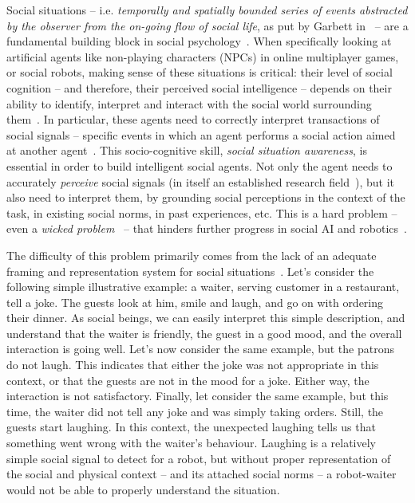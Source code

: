Social situations -- i.e. \emph{temporally and spatially bounded series of
events abstracted by the observer from the on-going flow of social life}, as
put by Garbett in~\cite{garbett1970analysis} -- are a fundamental building
block in social psychology~\cite{argyle1981social}. When specifically looking
at artificial agents like non-playing characters (NPCs) in online multiplayer
games, or social robots, making sense of these situations is critical: their
level of social cognition -- and therefore, their perceived social intelligence
-- depends on their ability to identify, interpret and interact with the social world
surrounding them~\cite{szczepanowski2017computational}. In particular, these
agents need to correctly interpret transactions of social signals -- specific
events in which an agent performs a social action aimed at another
agent~\cite{pantic2011social}. This socio-cognitive skill, \emph{social
situation awareness}, is essential in order to build intelligent social agents. Not only
the agent needs to accurately \emph{perceive} social signals (in itself an
established research field~\cite{pantic2011social,vinciarelli2009social}), but
it also need to interpret them, by grounding social perceptions in the context of
the task, in existing social norms, in past experiences, etc.  This is a hard
problem -- even a \emph{wicked problem}~\cite{west1967wicked} --  that
hinders further progress in social AI and robotics~\cite{yang2018grand}.

The difficulty of this problem primarily comes from the lack of an adequate
framing and representation system for social situations~\cite{webb2021framing}.
Let's consider the following simple illustrative example: a waiter, serving
customer in a restaurant, tell a joke. The guests look at him, smile and laugh,
and go on with ordering their dinner. As social beings, we can easily interpret
this simple description, and understand that the waiter is friendly, the guest
in a good mood, and the overall interaction is going well. Let's now consider
the same example, but the patrons do not laugh. This indicates that either the
joke was not appropriate in this context, or that the guests are not in the
mood for a joke. Either way, the interaction is not satisfactory. Finally, let
consider the same example, but this time, the waiter did not tell any joke and
was simply taking orders. Still, the guests start laughing. In this context,
the unexpected laughing tells us that something went wrong with the waiter's
behaviour.  Laughing is a relatively simple social signal to detect for a
robot, but without proper representation of the social and physical context --
and its attached social norms -- a robot-waiter would not be able to properly
understand the situation.

